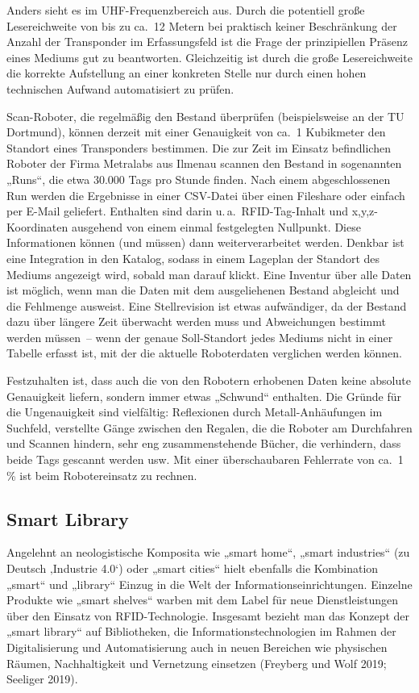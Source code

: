 \documentclass[
  11pt,
  letterpaper,
  DIV=11,
  twoside]{scrreprt}
\begin{document}
Anders sieht es im UHF-Frequenzbereich aus. Durch die potentiell große
Lesereichweite von bis zu ca.~12 Metern bei praktisch keiner
Beschränkung der Anzahl der Transponder im Erfassungsfeld ist die Frage
der prinzipiellen Präsenz eines Mediums gut zu beantworten. Gleichzeitig
ist durch die große Lesereichweite die korrekte Aufstellung an einer
konkreten Stelle nur durch einen hohen technischen Aufwand automatisiert
zu prüfen.

Scan-Roboter, die regelmäßig den Bestand überprüfen (beispielsweise an
der TU Dortmund), können derzeit mit einer Genauigkeit von ca.~1
Kubikmeter den Standort eines Transponders bestimmen. Die zur Zeit im
Einsatz befindlichen Roboter der Firma Metralabs aus Ilmenau scannen den
Bestand in sogenannten „Runs``, die etwa 30.000 Tags pro Stunde finden.
Nach einem abgeschlossenen Run werden die Ergebnisse in einer CSV-Datei
über einen Fileshare oder einfach per E-Mail geliefert. Enthalten sind
darin u.\,a.~RFID-Tag-Inhalt und x,y,z-Koordinaten ausgehend von einem
einmal festgelegten Nullpunkt. Diese Informationen können (und müssen)
dann weiterverarbeitet werden. Denkbar ist eine Integration in den
Katalog, sodass in einem Lageplan der Standort des Mediums angezeigt
wird, sobald man darauf klickt. Eine Inventur über alle Daten ist
möglich, wenn man die Daten mit dem ausgeliehenen Bestand abgleicht und
die Fehlmenge ausweist. Eine Stellrevision ist etwas aufwändiger, da der
Bestand dazu über längere Zeit überwacht werden muss und Abweichungen
bestimmt werden müssen~-- wenn der genaue Soll-Standort jedes Mediums
nicht in einer Tabelle erfasst ist, mit der die aktuelle Roboterdaten
verglichen werden können.

Festzuhalten ist, dass auch die von den Robotern erhobenen Daten keine
absolute Genauigkeit liefern, sondern immer etwas „Schwund`` enthalten.
Die Gründe für die Ungenauigkeit sind vielfältig: Reflexionen durch
Metall-Anhäufungen im Suchfeld, verstellte Gänge zwischen den Regalen,
die die Roboter am Durchfahren und Scannen hindern, sehr eng
zusammenstehende Bücher, die verhindern, dass beide Tags gescannt werden
usw. Mit einer überschaubaren Fehlerrate von ca.~1\,\% ist beim
Robotereinsatz zu rechnen.

\subsection{Smart Library}\label{smart-library}

Angelehnt an neologistische Komposita wie „smart home``, „smart
industries`` (zu Deutsch ‚Industrie 4.0`) oder „smart cities`` hielt
ebenfalls die Kombination „smart`` und „library`` Einzug in die Welt der
Informationseinrichtungen. Einzelne Produkte wie „smart shelves`` warben
mit dem Label für neue Dienstleistungen über den Einsatz von
RFID-Technologie. Insgesamt bezieht man das Konzept der „smart library``
auf Bibliotheken, die Informationstechnologien im Rahmen der
Digitalisierung und Automatisierung auch in neuen Bereichen wie
physischen Räumen, Nachhaltigkeit und Vernetzung einsetzen (Freyberg und
Wolf 2019; Seeliger 2019).
\end{document}

